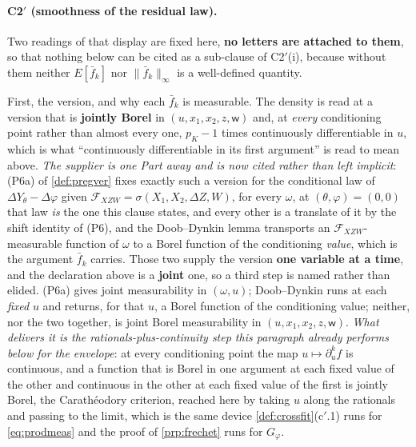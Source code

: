 \paragraph{C2$'$ (smoothness of the residual law).}

Two readings of that display are fixed here, \textbf{no letters are attached to them}, so that
nothing below can be cited as a sub-clause of C2$'$(i), because without them neither $E[\bar f_k]$ nor
$\|\bar f_k\|_\infty$ is a well-defined quantity.

First, the version, and why each $\bar f_k$ is measurable. The density is read at a version that
is \textbf{jointly Borel} in $(u,x_1,x_2,z,\mathsf w)$ and, at \emph{every} conditioning point rather than
almost every one, $p_K-1$ times continuously differentiable in $u$, which is what ``continuously
differentiable in its first argument'' is read to mean above. \emph{The supplier is one Part away and is now
cited rather than left implicit}: \textup{(P6a)} of \cref{def:pregver} fixes exactly such a version for the
conditional law of $\Delta Y_\theta-\Delta\varphi$ given $\mathcal F_{XZW}=\sigma(X_1,X_2,\Delta Z,W)$, for
every $\omega$, at $(\theta,\varphi)=(0,0)$ that law \emph{is} the one this clause states, and every other
is a translate of it by the shift identity of \textup{(P6)}, and the Doob--Dynkin lemma transports an
$\mathcal F_{XZW}$-measurable function of $\omega$ to
a Borel function of the conditioning \emph{value}, which is the argument $\bar f_k$ carries.
Those two supply the version \textbf{one variable at a time}, and the declaration above is a
\textbf{joint} one, so a third step is named rather than elided. \textup{(P6a)} gives joint measurability
in $(\omega,u)$; Doob--Dynkin runs at each \emph{fixed} $u$ and returns, for that $u$, a Borel function of
the conditioning value; neither, nor the two together, is joint Borel measurability in
$(u,x_1,x_2,z,\mathsf w)$. \emph{What delivers it is the rationals-plus-continuity step this paragraph
already performs below for the envelope}: at every conditioning point the map $u\mapsto\partial^{k}_uf$ is
continuous, and a
function that is Borel in one argument at each fixed value of the other and continuous in the other at each
fixed value of the first is jointly Borel, the Carath\'eodory criterion, reached here by taking $u$ along
the rationals and passing to the limit, which is the same device \cref{def:crossfit}\textup{(c$'$.1)}
runs for \eqref{eq:prodmeas} and the proof of \cref{prp:frechet} runs for $G_\varphi$.
